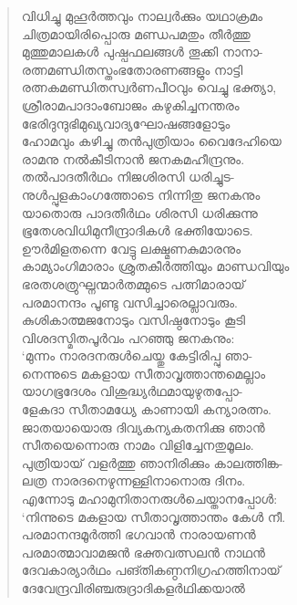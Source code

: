 \begin{verse}
വിധിച്ചു മുഹൂര്‍ത്തവും നാല്വര്‍ക്കും യഥാക്രമം\\
ചിത്രമായിരിപ്പൊരു മണ്ഡപമതും തീര്‍ത്തു\\
മുത്തുമാലകള്‍ പുഷ്പഫലങ്ങള്‍ തൂക്കി നാനാ-\\
രത്നമണ്ഡിതസ്തംഭതോരണങ്ങളും നാട്ടി\\
രത്നകമണ്ഡിതസ്വര്‍ണപീഠവും വെച്ചു ഭക്ത്യാ,\\
ശ്രീരാമപാദാംബോജം കഴുകിച്ചനന്തരം\\
ഭേരിദുന്ദുഭിമുഖ്യവാദ്യഘോഷങ്ങളോടും\\
ഹോമവും കഴിച്ചു തന്‍പുത്രിയാം വൈദേഹിയെ\\
രാമനു നല്‍കീടിനാന്‍ ജനകമഹീന്ദ്രനും.\\
തല്‍പാദതീര്‍ഥം നിജശിരസി ധരിച്ചുട-\\
നുള്‍പ്പുളകാംഗത്തോടെ നിന്നിതു ജനകനും\\
യാതൊരു പാദതീര്‍ഥം ശിരസി ധരിക്കുന്നു\\
ഭൂതേശവിധിമുനീന്ദ്രാദികള്‍ ഭക്തിയോടെ.\\
ഊര്‍മിളതന്നെ വേട്ടു ലക്ഷ്മണകുമാരനും\\
കാമ്യാംഗിമാരാം ശ്രുതകീര്‍ത്തിയും മാണ്ഡവിയും\\
ഭരതശത്രുഘ്നന്മാര്‍തമ്മുടെ പത്നിമാരായ്\\
പരമാനന്ദം പൂണ്ടു വസിച്ചാരെല്ലാവരും.\\
കുശികാത്മജനോടും വസിഷ്ഠനോടും കൂടി\\
വിശദസ്മിതപൂര്‍വം പറഞ്ഞു ജനകനും:\\
‘മുന്നം നാരദനരുള്‍ചെയ്തു കേട്ടിരിപ്പു ഞാ-\\
നെന്നുടെ മകളായ സീതാവൃത്താന്തമെല്ലാം\\
യാഗഭൂദേശം വിശുദ്ധ്യര്‍ഥമായുഴുതപ്പോ-\\
ളേകദാ സീതാമധ്യേ കാണായി കന്യാരത്നം.\\
ജാതയായൊരു ദിവ്യകന്യകതനിക്കു ഞാന്‍\\
സീതയെന്നൊരു നാമം വിളിച്ചേനതുമൂലം.\\
പുത്രിയായ് വളര്‍ത്തു ഞാനിരിക്കും കാലത്തിങ്ക-\\
ലത്ര നാരദനെഴുന്നള്ളിനാനൊരു ദിനം.\\
എന്നോടു മഹാമുനിതാനരുള്‍ചെയ്താനപ്പോള്‍:\\
‘നിന്നുടെ മകളായ സീതാവൃത്താന്തം കേള്‍ നീ.\\
പരമാനന്ദമൂര്‍ത്തി ഭഗവാന്‍ നാരായണന്‍\\
പരമാത്മാവാമജന്‍ ഭക്തവത്സലന്‍ നാഥന്‍\\
ദേവകാര്യാര്‍ഥം പങ്തികണ്ഠനിഗ്രഹത്തിനായ്\\
ദേവേന്ദ്രവിരിഞ്ചരുദ്രാദികളര്‍ഥിക്കയാല്‍\\

\end{verse}
